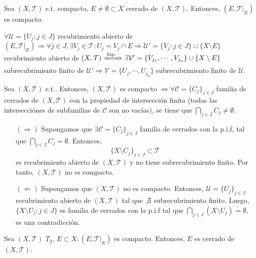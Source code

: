 \begin{prop}
  Sea $( X, \mathcal{T} )$ e.t. compacto, $E \neq \emptyset \subset X$ cerrado de $ ( X, \mathcal{T} )$. Entonces, $( E, \mathcal{T}|_{E})$ es compacto.
\end{prop}

 \begin{dem}
   $\forall \mathcal{U} = \{ U_{j} : j \in J \}$ recubrimiento abierto de $( E, \mathcal{T}|_{E}) \Rightarrow \forall j \in J, \exists V_{j} \in \mathcal{T} :  U_{j} = V_{j} \cap E \Rightarrow \mathcal{U}' = \{ V_{j} : j \in J \} \cup \{  X \setminus E \}$ recubrimiento abierto de $( X, \mathcal{T} ) \xRightarrow[]{ \text{ hip. } } \exists \mathcal{V}' = \{  V_{j_{1}}, \cdots, V_{j_{n}} \} \cup \{  X \setminus E \}$ subrecubrimiento finito de $\mathcal{U'} \Rightarrow \mathcal{V} = \{ U_{j}, \cdots, U_{j_{n}} \}$ subrecubrimiento finito de $\mathcal{U}$.
 \end{dem}

 \begin{prop}
   Sea $( X, \mathcal{T} )$ e.t.. Entonces, $( X, \mathcal{T} )$ es compacto $ \Leftrightarrow \forall \mathcal{C} = \{ C_{j} \}_{j \in J}$ familia de cerrados de $( X, \mathcal{T} )$ con la propiedad de intersección finita (todas las intersecciónes de subfamilias de $\mathcal{C}$ son no vacías), se tiene que $\bigcap_{j \in J} C_{j} \neq \emptyset$.
 \end{prop}

 \begin{dem}
   \begin{enumerate}[label=(\roman*)]
     \item []
     \item [$(\Rightarrow)$] Supongamos que $\exists \mathcal{C} = \{ C_{j} \}_{j \in J}$ familia de cerrados con la p.i,f, tal que $\bigcap_{j \in J} C_{j} = \emptyset$. Entonces,
       \[
         \{ X \setminus C_{j} \}_{j \in J} \subset \mathcal{T}
       \]
       es recubrimiento abierto de $( X, \mathcal{T} )$ y no tiene subrecubrimiento finito. Por tanto, $( X, \mathcal{T} )$ no es compacto.
       
     \item [$(\Leftarrow)$] Supongamos que $( X, \mathcal{T} )$ no es compacto. Entonces, $\mathcal{U} = \{ U_{j} \}_{j \in J}$ recubrimiento abierto de $( X, \mathcal{T} )$ tal que $\not\exists$ subrecubrimiento finito. Luego, $\{ X \setminus U_{j} : j \in J \}$ es familia de cerrados con la p.i.f tal que $\bigcap_{j \in J}(X \setminus U_{j}) = \emptyset$, es una contradicción.
   \end{enumerate}
 \end{dem}

 \begin{prop}
   Sea $( X, \mathcal{T} )$ $T_{2}$, $E \subset X : ( E, \mathcal{T}|_{E})$ es compacto. Entonces, $E$ es cerrado de $( X, \mathcal{T} )$.
 \end{prop}
